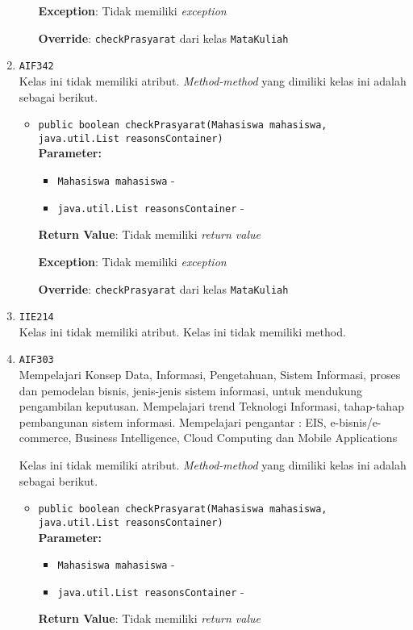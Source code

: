 \documentclass{article}
\begin{document}
\begin{enumerate}
\begin{itemize}
\textbf{Exception}: Tidak memiliki \textit{exception}

\textbf{Override}: \texttt{checkPrasyarat} dari kelas \texttt{MataKuliah}

\end{itemize}
\item \texttt{AIF342}\\ 


Kelas ini tidak memiliki atribut. \textit{Method-method} yang dimiliki kelas ini adalah sebagai berikut.
\begin{itemize}
\item \texttt{public boolean checkPrasyarat(Mahasiswa mahasiswa, java.util.List reasonsContainer)}\\ 


\textbf{Parameter:}\begin{itemize}
\item \texttt{Mahasiswa mahasiswa} - 
\item \texttt{java.util.List reasonsContainer} - 
\end{itemize}
\textbf{Return Value}: Tidak memiliki \textit{return value}

\textbf{Exception}: Tidak memiliki \textit{exception}

\textbf{Override}: \texttt{checkPrasyarat} dari kelas \texttt{MataKuliah}

\end{itemize}
\item \texttt{IIE214}\\ 


Kelas ini tidak memiliki atribut. Kelas ini tidak memiliki method. \item \texttt{AIF303}\\ 
Mempelajari Konsep Data, Informasi, Pengetahuan, Sistem Informasi, proses dan
 pemodelan bisnis, jenis-jenis sistem informasi, untuk mendukung pengambilan
 keputusan. Mempelajari trend Teknologi Informasi, tahap-tahap pembangunan
 sistem informasi. Mempelajari pengantar : EIS, e-bisnis/e-commerce, Business
 Intelligence, Cloud Computing dan Mobile Applications

Kelas ini tidak memiliki atribut. \textit{Method-method} yang dimiliki kelas ini adalah sebagai berikut.
\begin{itemize}
\item \texttt{public boolean checkPrasyarat(Mahasiswa mahasiswa, java.util.List reasonsContainer)}\\ 


\textbf{Parameter:}\begin{itemize}
\item \texttt{Mahasiswa mahasiswa} - 
\item \texttt{java.util.List reasonsContainer} - 
\end{itemize}
\textbf{Return Value}: Tidak memiliki \textit{return value}


\end{itemize}
\end{enumerate}
\end{document}
